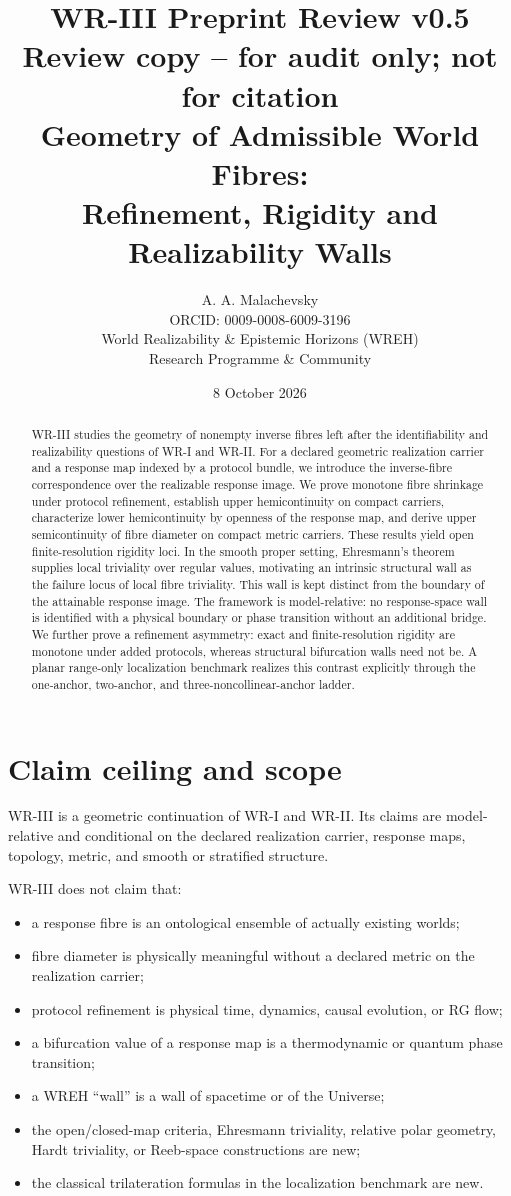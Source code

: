 \documentclass[11pt]{article}
\title{\textbf{WR-III Preprint Review v0.5}\\[2pt]
\normalsize Review copy -- for audit only; not for citation\\[6pt]
\large Geometry of Admissible World Fibres:\\
Refinement, Rigidity and Realizability Walls}
\author{A. A. Malachevsky\\
ORCID: 0009-0008-6009-3196\\
World Realizability \& Epistemic Horizons (WREH)\\
Research Programme \& Community}
\date{8 October 2026}
\begin{document}
\maketitle

\begin{abstract}
WR-III studies the geometry of nonempty inverse fibres left after the
identifiability and realizability questions of WR-I and WR-II. For a declared
geometric realization carrier and a response map indexed by a protocol bundle,
we introduce the inverse-fibre correspondence over the realizable response
image. We prove monotone fibre shrinkage under protocol refinement, establish
upper hemicontinuity on compact carriers, characterize lower hemicontinuity by
openness of the response map, and derive upper semicontinuity of fibre diameter
on compact metric carriers. These results yield open finite-resolution
rigidity loci. In the smooth proper setting, Ehresmann's theorem supplies local
triviality over regular values, motivating an intrinsic structural wall as the
failure locus of local fibre triviality. This wall is kept distinct from the
boundary of the attainable response image. The framework is model-relative:
no response-space wall is identified with a physical boundary or phase
transition without an additional bridge. We further prove a refinement
asymmetry: exact and finite-resolution rigidity are monotone under added
protocols, whereas structural bifurcation walls need not be. A planar
range-only localization benchmark realizes this contrast explicitly through
the one-anchor, two-anchor, and three-noncollinear-anchor ladder.
\end{abstract}

\section{Claim ceiling and scope}

WR-III is a geometric continuation of WR-I and WR-II. Its claims are
model-relative and conditional on the declared realization carrier, response
maps, topology, metric, and smooth or stratified structure.

WR-III does not claim that:
\begin{itemize}
\item a response fibre is an ontological ensemble of actually existing worlds;
\item fibre diameter is physically meaningful without a declared metric on the realization carrier;
\item protocol refinement is physical time, dynamics, causal evolution, or RG flow;
\item a bifurcation value of a response map is a thermodynamic or quantum phase transition;
\item a WREH ``wall'' is a wall of spacetime or of the Universe;
\item the open/closed-map criteria, Ehresmann triviality, relative polar geometry, Hardt triviality, or Reeb-space constructions are new;
\item the classical trilateration formulas in the localization benchmark are new.
\end{itemize}
\end{document}

